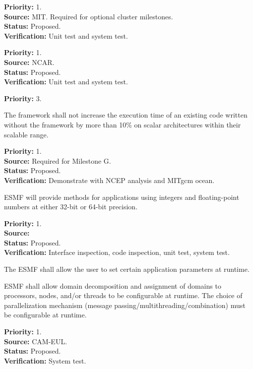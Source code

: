 \begin{reqlist}
{\bf Priority:} 1. \\
{\bf Source:} MIT.  Required for optional cluster milestones. \\
{\bf Status:} Proposed. \\
{\bf Verification:} Unit test and system test.
\end{reqlist}

\begin{reqlist}
{\bf Priority:} 1. \\
{\bf Source:} NCAR. \\
{\bf Status:} Proposed. \\
{\bf Verification:} Unit test and system test.
\end{reqlist}

\begin{reqlist}
  {\bf Priority:} 3.
\end{reqlist}

 \label{perf}
The framework shall not increase the execution time of an existing code 
written without the framework by more than 10\% on scalar 
architectures within their scalable range.
\begin{reqlist}
{\bf Priority:} 1. \\
{\bf Source:} Required for Milestone G. \\
{\bf Status:} Proposed. \\
{\bf Verification:} Demonstrate with NCEP analysis and MITgcm ocean.
\end{reqlist}

 ESMF will provide methods for applications using
integers and floating-point numbers at either 32-bit or 64-bit
precision.

\begin{reqlist}
  {\bf Priority:} 1. \\
  {\bf Source:} \\
  {\bf Status:} Proposed. \\
  {\bf Verification:} Interface inspection, code inspection, unit
  test, system test.
\end{reqlist}

 The ESMF shall allow the user to set
certain application parameters at runtime.

 ESMF shall allow domain
decomposition and assignment of domains to processors, nodes, and/or
threads to be configurable at runtime.  The choice of parallelization
mechanism (message passing/multithreading/combination) must be
configurable at runtime.
\begin{reqlist}
{\bf Priority:} 1. \\
{\bf Source:} CAM-EUL. \\
{\bf Status:} Proposed. \\
{\bf Verification:} System test.
\end{reqlist}

